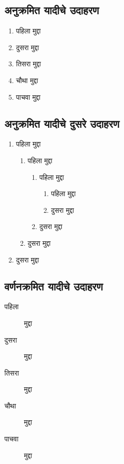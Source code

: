 \subsection{अनुक्रमित यादीचे उदाहरण}

\begin{enumerate}
\item पहिला मुद्दा
\item दुसरा मुद्दा
\item तिसरा मुद्दा
\item चौथा मुद्दा
\item पाचवा मुद्दा
\end{enumerate}

\subsection*{अनुक्रमित यादीचे दुसरे उदाहरण}

\begin{enumerate}
\item पहिला मुद्दा
  \begin{enumerate}
  \item पहिला मुद्दा
    \begin{enumerate}
    \item पहिला मुद्दा
      \begin{enumerate}
      \item पहिला मुद्दा
      \item दुसरा मुद्दा
      \end{enumerate}
    \item दुसरा मुद्दा
    \end{enumerate}
  \item दुसरा मुद्दा
  \end{enumerate}
\item दुसरा मुद्दा
\end{enumerate}

\subsection{वर्णनक्रमित यादीचे उदाहरण}

\begin{description}
\item[पहिला] मुद्दा
\item[दुसरा] मुद्दा
\item[तिसरा] मुद्दा
\item[चौथा] मुद्दा
\item[पाचवा] मुद्दा
\end{description}

